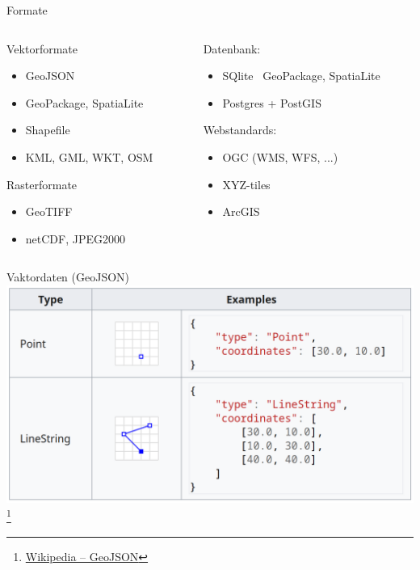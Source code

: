 \documentclass{beamer}
\begin{document}
		\begin{frame}{Formate}
			\begin{columns}[t]
				\begin{column}{0.47\textwidth}
					Vektorformate
					\begin{itemize}
						\item GeoJSON
						\item GeoPackage, SpatiaLite
						\item Shapefile
						\item KML, GML, WKT, OSM
					\end{itemize}
					\pause
					Rasterformate
					\begin{itemize}
						\item GeoTIFF
						\item netCDF, JPEG2000
					\end{itemize}
					\pause
				\end{column}
				\begin{column}{0.53\textwidth}
					Datenbank:
					\begin{itemize}
						\item SQlite \textrightarrow\ GeoPackage, SpatiaLite
						\item Postgres + PostGIS
					\end{itemize}
					\pause
					Webstandards:
					\begin{itemize}
						\item OGC (WMS, WFS, ...)
						\item XYZ-tiles
						\item ArcGIS
					\end{itemize}
				\end{column}
			\end{columns}
		\end{frame}
		
		\begin{frame}{Vaktordaten (GeoJSON)}
			\includegraphics[width=\textwidth]{images/geodata-vector-1.png}\footnote{\href{https://en.wikipedia.org/wiki/GeoJSON}{Wikipedia -- GeoJSON}}
		\end{frame}
		
\end{document}
